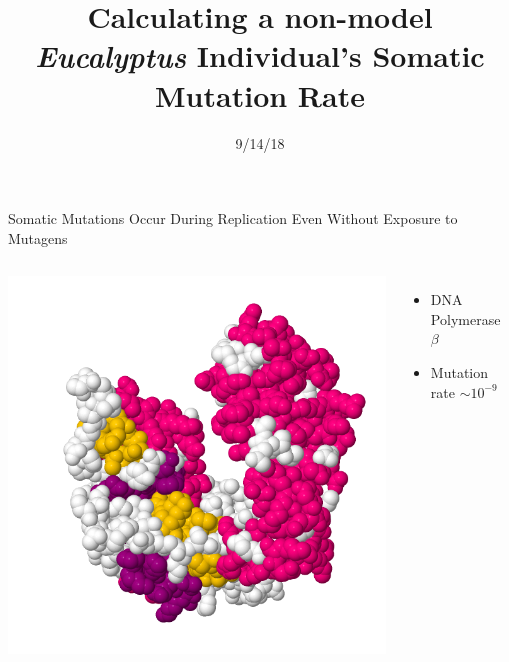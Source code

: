 \documentclass{beamer}
\title[Eucalyptus Somatic Mutation]{Calculating a non-model \textit{Eucalyptus} Individual's Somatic Mutation Rate}
\date{9/14/18}
\author{Adam Orr\hskip 1em \faicon{twitter}@AdamJOrr}
\begin{document}
\frame{\titlepage}


\begin{frame}{Somatic Mutations Occur During Replication Even Without Exposure to Mutagens}
\begin{columns}
		\includegraphics[width=\linewidth]{dnapol_beta.png}
		\begin{itemize}
			\item DNA Polymerase $\beta$
			\item Mutation rate $\sim10^{-9}$
		\end{itemize}
		\vskip 3in
\end{columns}
\end{frame}
\end{document}
